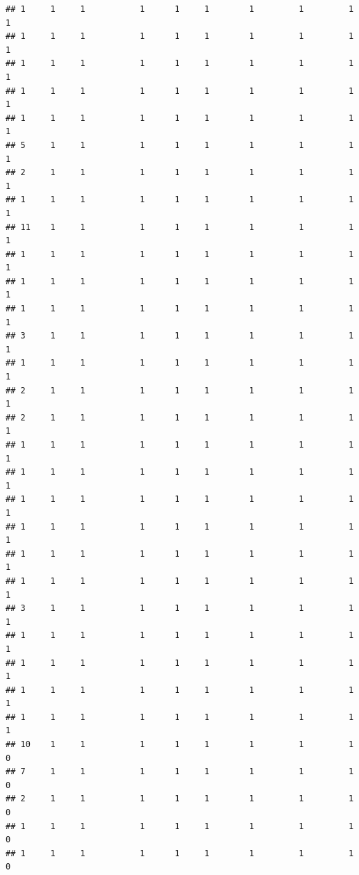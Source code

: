 \documentclass[
]{article}
\begin{document}
\begin{verbatim}
## 1     1     1           1      1     1        1         1         1          1
## 1     1     1           1      1     1        1         1         1          1
## 1     1     1           1      1     1        1         1         1          1
## 1     1     1           1      1     1        1         1         1          1
## 1     1     1           1      1     1        1         1         1          1
## 5     1     1           1      1     1        1         1         1          1
## 2     1     1           1      1     1        1         1         1          1
## 1     1     1           1      1     1        1         1         1          1
## 11    1     1           1      1     1        1         1         1          1
## 1     1     1           1      1     1        1         1         1          1
## 1     1     1           1      1     1        1         1         1          1
## 1     1     1           1      1     1        1         1         1          1
## 3     1     1           1      1     1        1         1         1          1
## 1     1     1           1      1     1        1         1         1          1
## 2     1     1           1      1     1        1         1         1          1
## 2     1     1           1      1     1        1         1         1          1
## 1     1     1           1      1     1        1         1         1          1
## 1     1     1           1      1     1        1         1         1          1
## 1     1     1           1      1     1        1         1         1          1
## 1     1     1           1      1     1        1         1         1          1
## 1     1     1           1      1     1        1         1         1          1
## 1     1     1           1      1     1        1         1         1          1
## 3     1     1           1      1     1        1         1         1          1
## 1     1     1           1      1     1        1         1         1          1
## 1     1     1           1      1     1        1         1         1          1
## 1     1     1           1      1     1        1         1         1          1
## 1     1     1           1      1     1        1         1         1          1
## 10    1     1           1      1     1        1         1         1          0
## 7     1     1           1      1     1        1         1         1          0
## 2     1     1           1      1     1        1         1         1          0
## 1     1     1           1      1     1        1         1         1          0
## 1     1     1           1      1     1        1         1         1          0

\end{verbatim}
\end{document}
